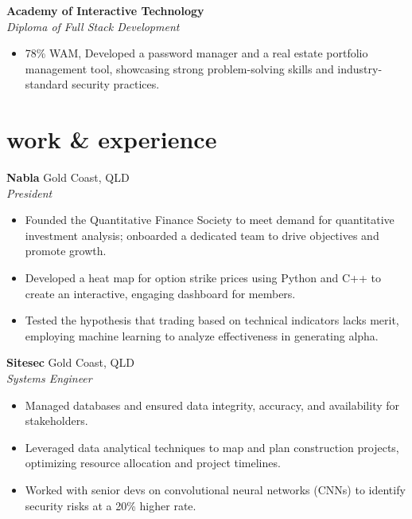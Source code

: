 \documentclass[12pt]{article}
\begin{document}
\textbf{Academy of Interactive Technology} \\
\indent \textit{\color{subtextgray}Diploma of Full Stack Development}
\begin{itemize}[topsep=0em, left=0.8em]	
  \item 78\% WAM, Developed a password manager and a real estate portfolio management tool, showcasing strong problem-solving skills and industry-standard security practices.
\end{itemize}

\vspace{1em}

\section{work \& experience}

\vspace{0.20em}

\textbf{Nabla} \hfill {Gold Coast, QLD} \\
\indent \textit{\color{subtextgray}President}
\begin{itemize}[noitemsep, topsep=0em, left=0.8em]
  \item Founded the Quantitative Finance Society to meet demand for quantitative investment analysis; onboarded a dedicated team to drive objectives and promote growth.
  \item	Developed a heat map for option strike prices using Python and C++ to create an interactive, engaging dashboard for members.
  \item Tested the hypothesis that trading based on technical indicators lacks merit, employing machine learning to analyze effectiveness in generating alpha.
\end{itemize}

\textbf{Sitesec} \hfill {Gold Coast, QLD} \\
\indent \textit{\color{subtextgray}Systems Engineer}
\begin{itemize}[noitemsep, topsep=0em, left=0.8em]
  \item Managed databases and ensured data integrity, accuracy, and availability for stakeholders.
  \item	Leveraged data analytical techniques to map and plan construction projects, optimizing resource allocation and project timelines.
  \item Worked with senior devs on convolutional neural networks (CNNs) to identify security risks at a 20\% higher rate.
\end{itemize}
\end{document}
